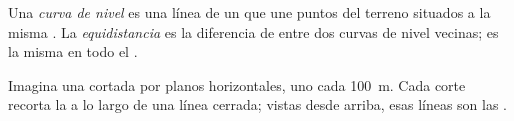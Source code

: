 \begin{definition}\label{def:g9:maps-of-the-earth:contour}
Una \emph{curva de nivel} es una línea de un 
que une puntos del terreno situados a la misma . La
\emph{equidistancia} es la diferencia de  entre
dos curvas de nivel vecinas; es la misma en todo el .
\end{definition}

Imagina una  cortada por planos horizontales, uno cada \qty{100}{m}.
Cada corte recorta la  a lo largo de una línea cerrada; vistas desde
arriba, esas líneas son las .

